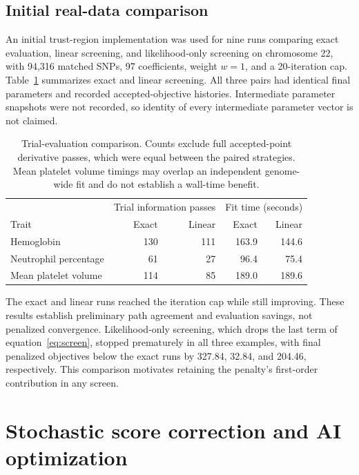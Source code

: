 \documentclass[11pt]{article}
\begin{document}
\subsection{Initial real-data comparison}
An initial trust-region implementation was used for nine runs comparing exact evaluation, linear screening, and likelihood-only screening on chromosome 22, with 94,316 matched SNPs, 97 coefficients, weight $w=1$, and a 20-iteration cap. Table~\ref{tab:screen} summarizes exact and linear screening. All three pairs had identical final parameters and recorded accepted-objective histories. Intermediate parameter snapshots were not recorded, so identity of every intermediate parameter vector is not claimed.
\begin{table}[H]
\centering
\small
\begin{tabular}{lrrrr}
\toprule
&\multicolumn{2}{c}{Trial information passes}&\multicolumn{2}{c}{Fit time (seconds)}\\
Trait&Exact&Linear&Exact&Linear\\
\midrule
Hemoglobin&130&111&163.9&144.6\\
Neutrophil percentage&61&27&96.4&75.4\\
Mean platelet volume&114&85&189.0&189.6\\
\bottomrule
\end{tabular}
\caption{Trial-evaluation comparison. Counts exclude full accepted-point derivative passes, which were equal between the paired strategies. Mean platelet volume timings may overlap an independent genome-wide fit and do not establish a wall-time benefit.}
\label{tab:screen}
\end{table}
The exact and linear runs reached the iteration cap while still improving. These results establish preliminary path agreement and evaluation savings, not penalized convergence. Likelihood-only screening, which drops the last term of equation~\eqref{eq:screen}, stopped prematurely in all three examples, with final penalized objectives below the exact runs by 327.84, 32.84, and 204.46, respectively. This comparison motivates retaining the penalty's first-order contribution in any screen.

\section{Stochastic score correction and AI optimization}
\end{document}
